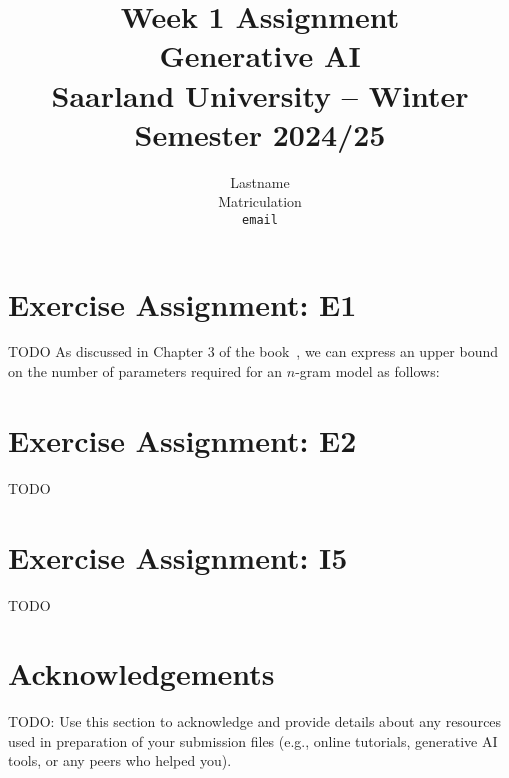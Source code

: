 \documentclass{article}
\title{Week 1 Assignment\\
\vspace{2mm}
\small{Generative AI}
\\
\vspace{2mm}
\small{Saarland University -- Winter Semester 2024/25}
}
\author{%
  Lastname \\
  Matriculation \\
  \texttt{email} \\
}
\begin{document}
\maketitle

\section{Exercise Assignment: E1}
TODO As discussed in Chapter 3 of the book~\cite{jm3},  we can express an upper bound on the number of parameters required for an $n$-gram model as follows: 

\section{Exercise Assignment: E2}
TODO

\section{Exercise Assignment: I5}
TODO

\clearpage

\section*{Acknowledgements}
TODO: Use this section to acknowledge and provide details about any resources used in preparation of your submission files (e.g., online tutorials, generative AI tools, or any peers who helped you).




\end{document}
